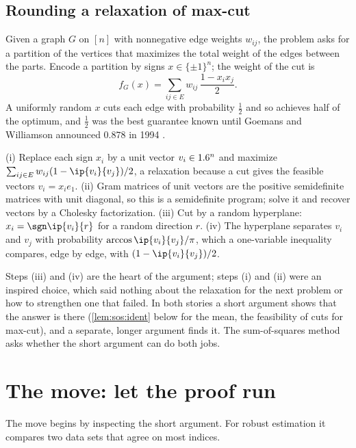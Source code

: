 \begin{refsection}
\subsection{Rounding a relaxation of max-cut}\label{sec:sos:gw-before}

Given a graph $G$ on $[n]$ with nonnegative edge weights $w_{ij}$, the  problem asks for a partition of the vertices that maximizes the total weight of the edges between the parts. Encode a partition by signs $x\in\{\pm1\}^n$; the weight of the cut is
\[
  f_G(x)=\sum_{ij\in E} w_{ij}\,\frac{1-x_ix_j}{2}.
\]
A uniformly random $x$ cuts each edge with probability $\frac12$ and so achieves half of the optimum, and $\frac12$ was the best guarantee known until Goemans and Williamson announced $0.878$ in 1994 \parencite{GoemansWilliamson1995}.

\begin{aside}
(i) Replace each sign $x_i$ by a unit vector $v_i\in1.6^n$ and maximize $\sum_{ij\in E}w_{ij}(1-\ip{v_i}{v_j})/2$, a relaxation because a cut gives the feasible vectors $v_i=x_ie_1$. (ii) Gram matrices of unit vectors are the positive semidefinite matrices with unit diagonal, so this is a semidefinite program; solve it and recover vectors by a Cholesky factorization. (iii) Cut by a random hyperplane: $x_i=\sgn\ip{v_i}{r}$ for a random direction $r$. (iv) The hyperplane separates $v_i$ and $v_j$ with probability $\arccos\ip{v_i}{v_j}/\pi$, which a one-variable inequality compares, edge by edge, with $(1-\ip{v_i}{v_j})/2$.
\end{aside}

Steps (iii) and (iv) are the heart of the argument; steps (i) and (ii) were an inspired choice, which said nothing about the relaxation for the next problem or how to strengthen one that failed. In both stories a short argument shows that the answer is there (\cref{lem:sos:ident} below for the mean, the feasibility of cuts for max-cut), and a separate, longer argument finds it. The sum-of-squares method asks whether the short argument can do both jobs.

\section{The move: let the proof run}\label{sec:sos:move}

The move begins by inspecting the short argument. For robust estimation it compares two data sets that agree on most indices.


\end{refsection}
